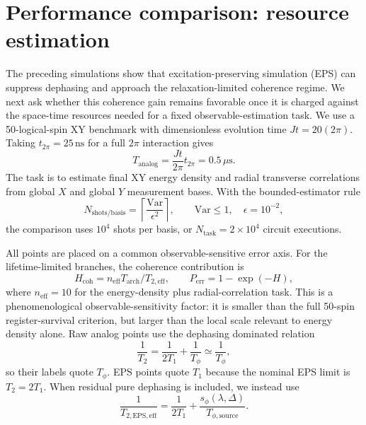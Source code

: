 
\section{Performance comparison: resource estimation}
\label{sec:resource-estimation}

The preceding simulations show that excitation-preserving simulation (EPS) can
suppress dephasing and approach the relaxation-limited coherence regime. We next
ask whether this coherence gain remains favorable once it is charged against the
space-time resources needed for a fixed observable-estimation task. We use a
50-logical-spin XY benchmark with dimensionless evolution time
\(Jt=20(2\pi)\). Taking \(t_{2\pi}=25\,\mathrm{ns}\) for a full \(2\pi\)
interaction gives
\begin{equation}
T_{\mathrm{analog}}
= \frac{Jt}{2\pi} t_{2\pi}
=0.5\,\mu\mathrm{s}.
\end{equation}
The task is to estimate final XY energy density and radial transverse
correlations from global \(X\) and global \(Y\) measurement bases. With the
bounded-estimator rule
\begin{equation}
N_{\mathrm{shots/basis}}
=\left\lceil \frac{\mathrm{Var}}{\epsilon^2}\right\rceil,
\qquad
\mathrm{Var}\le 1,\quad \epsilon=10^{-2},
\end{equation}
the comparison uses \(10^4\) shots per basis, or
\(N_{\mathrm{task}}=2\times 10^4\) circuit executions.

All points are placed on a common observable-sensitive error axis. For the
lifetime-limited branches, the coherence contribution is
\begin{equation}
H_{\mathrm{coh}}
= n_{\mathrm{eff}} T_{\mathrm{arch}}/T_{2,\mathrm{eff}},
\qquad
P_{\mathrm{err}}=1-\exp(-H),
\end{equation}
where \(n_{\mathrm{eff}}=10\) for the energy-density plus radial-correlation
task. This is a phenomenological observable-sensitivity factor: it is smaller
than the full 50-spin register-survival criterion, but larger than the local
scale relevant to energy density alone. Raw analog points use the dephasing
dominated relation
\begin{equation}
\frac{1}{T_2}=\frac{1}{2T_1}+\frac{1}{T_\phi}
\simeq \frac{1}{T_\phi},
\end{equation}
so their labels quote \(T_\phi\). EPS points quote \(T_1\) because the nominal
EPS limit is \(T_2=2T_1\). When residual pure dephasing is included, we instead
use
\begin{equation}
\frac{1}{T_{2,\mathrm{EPS,eff}}}
=\frac{1}{2T_1}
+\frac{s_\phi(\lambda,\Delta)}{T_{\phi,\mathrm{source}}}.
\label{eq:eps-residual-dephasing}
\end{equation}

